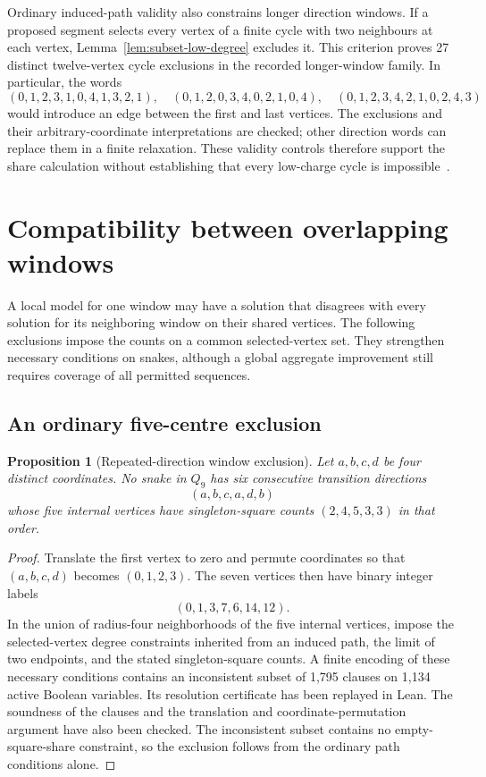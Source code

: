 \documentclass[11pt,a4paper]{article}
\newtheorem{proposition}[theorem]{Proposition}
\theoremstyle{definition}
\theoremstyle{remark}
\newcommand{\Q}{Q}
\begin{document}
Ordinary induced-path validity also constrains longer direction windows. If a proposed segment selects every vertex of a finite cycle with two neighbours at each vertex, Lemma~\ref{lem:subset-low-degree} excludes it. This criterion proves 27 distinct twelve-vertex cycle exclusions in the recorded longer-window family. In particular, the words
\[
(0,1,2,3,1,0,4,1,3,2,1),\quad
(0,1,2,0,3,4,0,2,1,0,4),\quad
(0,1,2,3,4,2,1,0,2,4,3)
\]
would introduce an edge between the first and last vertices. The exclusions and their arbitrary-coordinate interpretations are checked; other direction words can replace them in a finite relaxation. These validity controls therefore support the share calculation without establishing that every low-charge cycle is impossible~\cite{geometricarchive}.

\section{Compatibility between overlapping windows}\label{sec:compatibility}
A local model for one window may have a solution that disagrees with every solution for its neighboring window on their shared vertices. The following exclusions impose the counts on a common selected-vertex set. They strengthen necessary conditions on snakes, although a global aggregate improvement still requires coverage of all permitted sequences.

\subsection{An ordinary five-centre exclusion}\label{sec:direct-share}
\begin{proposition}[Repeated-direction window exclusion]\label{prop:share-window-exclusion}
Let $a,b,c,d$ be four distinct coordinates. No snake in $\Q_9$ has six consecutive transition directions
\[
(a,b,c,a,d,b)
\]
whose five internal vertices have singleton-square counts $(2,4,5,3,3)$ in that order.
\end{proposition}
\begin{proof}
Translate the first vertex to zero and permute coordinates so that $(a,b,c,d)$ becomes $(0,1,2,3)$. The seven vertices then have binary integer labels
\[
(0,1,3,7,6,14,12).
\]
In the union of radius-four neighborhoods of the five internal vertices, impose the selected-vertex degree constraints inherited from an induced path, the limit of two endpoints, and the stated singleton-square counts. A finite encoding of these necessary conditions contains an inconsistent subset of 1,795 clauses on 1,134 active Boolean variables. Its resolution certificate has been replayed in Lean. The soundness of the clauses and the translation and coordinate-permutation argument have also been checked. The inconsistent subset contains no empty-square-share constraint, so the exclusion follows from the ordinary path conditions alone.
\end{proof}
\end{document}
